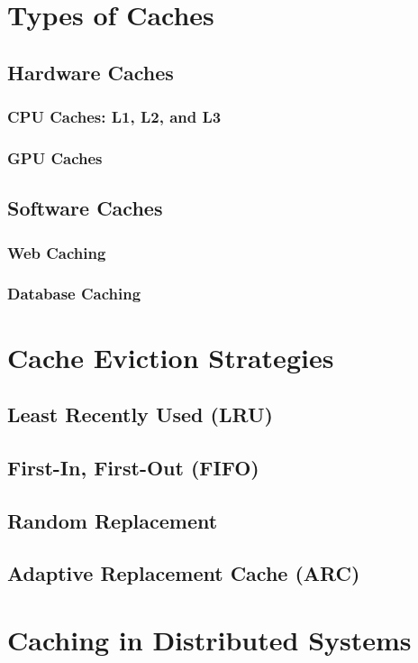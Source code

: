 \documentclass[12pt]{book} %
\begin{document}
\section{Types of Caches}
\subsection{Hardware Caches}
\subsubsection{CPU Caches: L1, L2, and L3}
\subsubsection{GPU Caches}
\subsection{Software Caches}
\subsubsection{Web Caching}
\subsubsection{Database Caching}

\section{Cache Eviction Strategies}
\subsection{Least Recently Used (LRU)}
\subsection{First-In, First-Out (FIFO)}
\subsection{Random Replacement}
\subsection{Adaptive Replacement Cache (ARC)}

\section{Caching in Distributed Systems}
\end{document}
